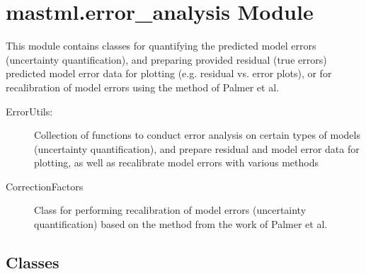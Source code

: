 \documentclass[letterpaper,10pt,english]{sphinxmanual}
\begin{document}
\section{mastml.error\_analysis Module}
\label{\detokenize{4_error_analysis:module-mastml.error_analysis}}\label{\detokenize{4_error_analysis:mastml-error-analysis-module}}
This module contains classes for quantifying the predicted model errors (uncertainty quantification), and preparing
provided residual (true errors) predicted model error data for plotting (e.g. residual vs. error plots), or for
recalibration of model errors using the method of Palmer et al.
\begin{description}
\item[{ErrorUtils:}] \leavevmode
Collection of functions to conduct error analysis on certain types of models (uncertainty quantification), and prepare
residual and model error data for plotting, as well as recalibrate model errors with various methods

\item[{CorrectionFactors}] \leavevmode
Class for performing recalibration of model errors (uncertainty quantification) based on the method from the
work of Palmer et al.

\end{description}


\subsection{Classes}
\label{\detokenize{4_error_analysis:classes}}
\end{document}
